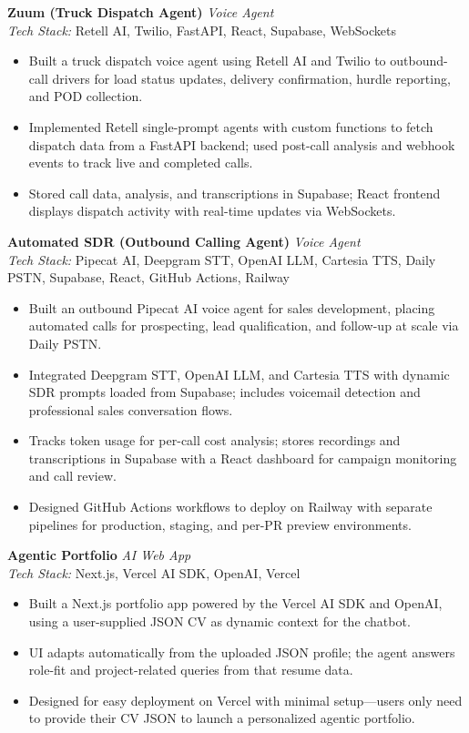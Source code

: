 \documentclass[11pt,a4paper]{article}
\newcommand{\resumeItemList}{\begin{itemize}[leftmargin=*, nosep, topsep=2pt]}
\newcommand{\resumeItemListEnd}{\end{itemize}}
\begin{document}
\vspace{4pt}

\textbf{Zuum (Truck Dispatch Agent)} \hfill \textit{Voice Agent} \\
\textit{Tech Stack:} Retell AI, Twilio, FastAPI, React, Supabase, WebSockets
\resumeItemList
  \item Built a truck dispatch voice agent using Retell AI and Twilio to outbound-call drivers for load status updates, delivery confirmation, hurdle reporting, and POD collection.
  \item Implemented Retell single-prompt agents with custom functions to fetch dispatch data from a FastAPI backend; used post-call analysis and webhook events to track live and completed calls.
  \item Stored call data, analysis, and transcriptions in Supabase; React frontend displays dispatch activity with real-time updates via WebSockets.
\resumeItemListEnd

\vspace{4pt}

\textbf{Automated SDR (Outbound Calling Agent)} \hfill \textit{Voice Agent} \\
\textit{Tech Stack:} Pipecat AI, Deepgram STT, OpenAI LLM, Cartesia TTS, Daily PSTN, Supabase, React, GitHub Actions, Railway
\resumeItemList
  \item Built an outbound Pipecat AI voice agent for sales development, placing automated calls for prospecting, lead qualification, and follow-up at scale via Daily PSTN.
  \item Integrated Deepgram STT, OpenAI LLM, and Cartesia TTS with dynamic SDR prompts loaded from Supabase; includes voicemail detection and professional sales conversation flows.
  \item Tracks token usage for per-call cost analysis; stores recordings and transcriptions in Supabase with a React dashboard for campaign monitoring and call review.
  \item Designed GitHub Actions workflows to deploy on Railway with separate pipelines for production, staging, and per-PR preview environments.
\resumeItemListEnd

\vspace{4pt}

\textbf{Agentic Portfolio} \hfill \textit{AI Web App} \\
\textit{Tech Stack:} Next.js, Vercel AI SDK, OpenAI, Vercel
\resumeItemList
  \item Built a Next.js portfolio app powered by the Vercel AI SDK and OpenAI, using a user-supplied JSON CV as dynamic context for the chatbot.
  \item UI adapts automatically from the uploaded JSON profile; the agent answers role-fit and project-related queries from that resume data.
  \item Designed for easy deployment on Vercel with minimal setup---users only need to provide their CV JSON to launch a personalized agentic portfolio.
\resumeItemListEnd
\end{document}
